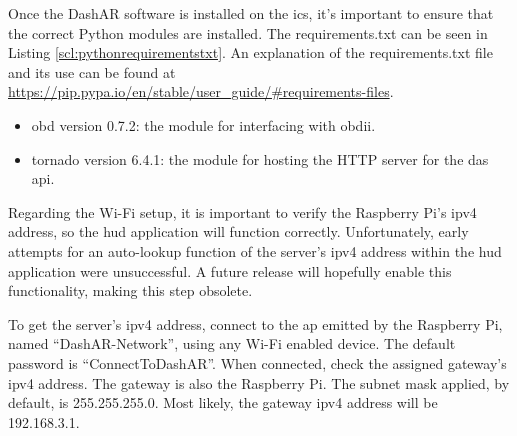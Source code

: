             \begin{singlespacecode}
                
            \end{singlespacecode}

            \begin{singlespacecode}
                
            \end{singlespacecode}

            \par Once the DashAR software is installed on the \gls{ics}, it's important to ensure that the correct Python modules are installed. The requirements.txt can be seen in Listing \ref{scl:pythonrequirementstxt}. An explanation of the requirements.txt file and its use can be found at \url{https://pip.pypa.io/en/stable/user_guide/#requirements-files}.

            \begin{itemize}
                \item obd version 0.7.2: the module for interfacing with \gls{obdii}.
                \item tornado version 6.4.1: the module for hosting the HTTP server for the \gls{das} \gls{api}.
            \end{itemize}

            \begin{singlespacecode}
                
            \end{singlespacecode}

            \par Regarding the Wi-Fi setup, it is important to verify the Raspberry Pi's \gls{ipv4} address, so the \gls{hud} application will function correctly. Unfortunately, early attempts for an auto-lookup function of the server's \gls{ipv4} address within the \gls{hud} application were unsuccessful. A future release will hopefully enable this functionality, making this step obsolete.

            \par To get the server's \gls{ipv4} address, connect to the \gls{ap} emitted by the Raspberry Pi, named ``DashAR-Network'', using any Wi-Fi enabled device. The default password is ``ConnectToDashAR''. When connected, check the assigned gateway's \gls{ipv4} address. The gateway is also the Raspberry Pi. The subnet mask applied, by default, is 255.255.255.0. Most likely, the gateway \gls{ipv4} address will be 192.168.3.1.

